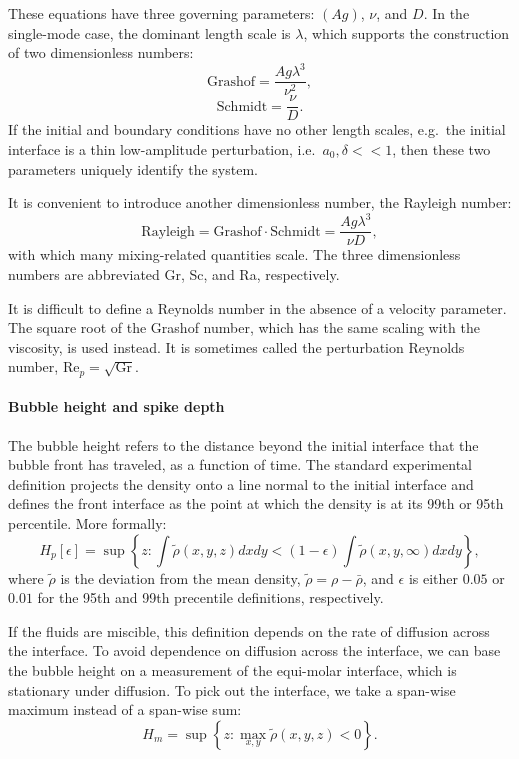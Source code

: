 These equations have three governing parameters: $(Ag)$, $\nu$, and $D$.
In the single-mode case, the dominant length scale is $\lambda$, which supports the construction of two dimensionless numbers:
\begin{equation}
\text{Grashof} = \frac{Ag \lambda^3}{\nu^2},
\end{equation}
\begin{equation}
\text{Schmidt} = \frac{\nu}{D}.
\end{equation}
If the initial and boundary conditions have no other length scales, e.g.\ the initial interface is a thin low-amplitude perturbation, i.e.\ $a_0, \delta << 1$, then these two parameters uniquely identify the system.

It is convenient to introduce another dimensionless number, the Rayleigh number:
\begin{equation}
\text{Rayleigh} = \text{Grashof} \cdot \text{Schmidt} = \frac{A g \lambda^3}{\nu D},
\end{equation}
with which many mixing-related quantities scale.
The three dimensionless numbers are abbreviated Gr, Sc, and Ra, respectively.

It is difficult to define a Reynolds number in the absence of a velocity parameter.
The square root of the Grashof number, which has the same scaling with the viscosity, is used instead.
It is sometimes called the perturbation Reynolds number, $\text{Re}_p = \sqrt{\text{Gr}}$.

\paragraph{Bubble height and spike depth}

The bubble height refers to the distance beyond the initial interface that the bubble front has traveled, as a function of time.
The standard experimental definition projects the density onto a line normal to the initial interface and defines the front interface as the point at which the density is at its 99th or 95th percentile.
More formally:
\begin{equation}
H_p[\epsilon] = \sup \left\{z : \int \tilde\rho(x,y,z) dx dy < (1-\epsilon) \int \tilde\rho(x,y,\infty) dx dy \right\},
\end{equation}
where $\tilde\rho$ is the deviation from the mean density, $\tilde\rho = \rho - \bar\rho$, and $\epsilon$ is either $0.05$ or $0.01$ for the 95th and 99th precentile definitions, respectively.

If the fluids are miscible, this definition depends on the rate of diffusion across the interface.
To avoid dependence on diffusion across the interface, we can base the bubble height on a measurement of the equi-molar interface, which is stationary under diffusion.
To pick out the interface, we take a span-wise maximum instead of a span-wise sum:
\begin{equation}
H_m = \sup \left\{z : \max_{x,y} \tilde\rho(x,y,z) < 0 \right\}.
\end{equation}

